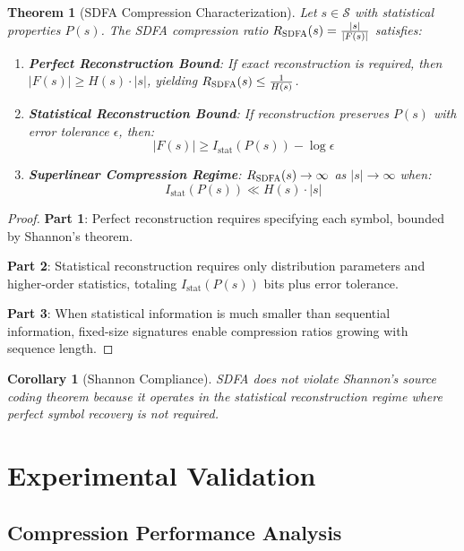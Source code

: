 \documentclass[10pt,journal,compsoc]{IEEEtran}
\newtheorem{theorem}{Theorem}
\newtheorem{corollary}{Corollary}
\newcommand{\sdfa}{\textsc{SDFA}}
\newcommand{\seqspace}{\mathcal{S}}
\newcommand{\entropy}[1]{H(#1)}
\newcommand{\prob}[1]{P(#1)}
\begin{document}
\begin{theorem}[\sdfa{} Compression Characterization]
Let $s \in \seqspace$ with statistical properties $\prob{s}$. The \sdfa{} compression ratio $R_{\sdfa}(s) = \frac{|s|}{|F(s)|}$ satisfies:

\begin{enumerate}
    \item \textbf{Perfect Reconstruction Bound}: If exact reconstruction is required, then $|F(s)| \geq \entropy{s} \cdot |s|$, yielding $R_{\sdfa}(s) \leq \frac{1}{\entropy{s}}$.
    
    \item \textbf{Statistical Reconstruction Bound}: If reconstruction preserves $\prob{s}$ with error tolerance $\epsilon$, then:
    \[|F(s)| \geq I_{\text{stat}}(\prob{s}) - \log \epsilon\]
    
    \item \textbf{Superlinear Compression Regime}: $R_{\sdfa}(s) \to \infty$ as $|s| \to \infty$ when:
    \[I_{\text{stat}}(\prob{s}) \ll \entropy{s} \cdot |s|\]
\end{enumerate}
\end{theorem}

\begin{proof}
\textbf{Part 1}: Perfect reconstruction requires specifying each symbol, bounded by Shannon's theorem.

\textbf{Part 2}: Statistical reconstruction requires only distribution parameters and higher-order statistics, totaling $I_{\text{stat}}(\prob{s})$ bits plus error tolerance.

\textbf{Part 3}: When statistical information is much smaller than sequential information, fixed-size signatures enable compression ratios growing with sequence length.
\end{proof}

\begin{corollary}[Shannon Compliance]
\sdfa{} does not violate Shannon's source coding theorem because it operates in the statistical reconstruction regime where perfect symbol recovery is not required.
\end{corollary}

\section{Experimental Validation}

\subsection{Compression Performance Analysis}
\end{document}
